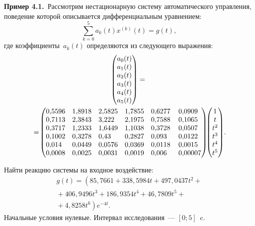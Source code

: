 \begin{multicols}{2}
\noindent
\textbf{Пример 4.1.}\
Рассмотрим нестационарную систему автоматического управления, 
поведение которой описывается дифференциальным уравнением:
$$
\sum\limits_{k=0}^5 a_k(t)x^{(k)}(t)=g(t),
$$
где коэффициенты~$a_k(t)$ определяются из сле\-ду\-юще\-го выражения:
{\small
\begin{multline*}
\begin{pmatrix}
a_0(t)\\a_1(t)\\a_2(t)\\a_3(t)\\a_4(t)\\a_5(t)\end{pmatrix}={}\\
\!\!{}=\!
\begin{pmatrix}0{,}5596&1{,}8918&2{,}5825&1{,}7855&0{,}6277&\!\!0{,}0909\\
0{,}7113&2{,}3843&3{,}222\hphantom{9}&2{,}1975&0{,}7588&\!\!0{,}1065\\
0{,}3717&1{,}2333&1{,}6449&1{,}1038&0{,}3728&\!\!0{,}0507\\
0{,}1002&0{,}3278&0{,}43\hphantom{99}&0{,}2827&0{,}093\hphantom{9}&\!\!0{,}0122\\
0{,}014\hphantom{9}&0{,}0449&0{,}0576&0{,}0369&0{,}0118&\!\!0{,}0015\\
0{,}0008&0{,}0025&0{,}0031&0{,}0019&0{,}006\hphantom{9}&\!\!\hphantom{9}0{,}00007
\end{pmatrix}\!\!
\begin{pmatrix}1\\t\\t^2\\t^3\\t^4\\t^5\end{pmatrix}\!.\hspace*{-2.77pt}
\end{multline*}
}

\noindent
Найти реакцию системы на входное воздействие:
\begin{multline*}
g(t)=\left(85{,}7661+338{,}5984t+497{,}0437t^2+{}\right.\\
{}+406{,}9496t^3+186{,}9354t^4+46{,}7809t^5+{}\\
\left.{}+4{,}8258t^6\right)e^{-4t}.
\end{multline*}
Начальные условия нулевые. Интервал исследования~--- $[0;5]$~c.

\columnbreak




\smallskip


\end{multicols}

